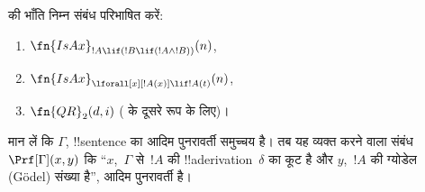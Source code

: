 \documentclass[../../../include/open-logic-section]{subfiles}
\begin{document}
\begin{prob}
 की भाँति निम्न संबंध परिभाषित करें:
\begin{enumerate}
\item $\fn{IsAx}_{!A \lif (!B \lif (!A \land !B))}(n)$,
\item $\fn{IsAx}_{\lforall[x][!A(x)] \lif !A(t)}(n)$,
\item $\fn{QR}_{2}(d, i)$ (\QR{} के दूसरे रूप के लिए)।
\end{enumerate}
\end{prob}

\begin{prop}
मान लें कि $\Gamma$, !!{sentence} का आदिम पुनरावर्ती समुच्चय है। तब यह
व्यक्त करने वाला संबंध $\Prf[\Gamma](x, y)$ कि ``$x$,~$\Gamma$ से~$!A$ की
!!a{derivation}~$\delta$ का कूट है और $y$,~$!A$ की ग्योडेल (G\"odel) संख्या
है'', आदिम पुनरावर्ती है।
\end{prop}
\end{document}
